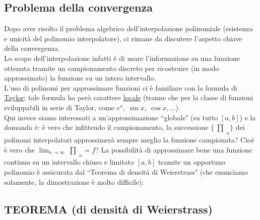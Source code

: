 \documentclass[12pt,headings=optiontohead]{article}
\DeclarePairedDelimiter{\abs}{\lvert}{\rvert}
\newcommand{\inter}{\begin{matrix}\prod\end{matrix}}
\begin{document}
\subsection{Problema della convergenza}
Dopo aver risolto il problema algebrico dell'interpolazione polinomiale (esistenza e unicità del polinomio interpolatore), ci rimane da discutere l'aspetto chiave della convergenza.\\
Lo scopo dell'interpolazione infatti è di usare l'informazione su una funzione ottenuta tramite un campionamento discreto per ricostruire (in modo approssimato)
la funzione su un intero intervallo.\\
L'uso di polinomi per approssimare funzioni ci è familiare con la formula di \uline{Taylor}; tale formula ha però carattere \uline{locale} (tranne che per la classe di funzioni sviluppabili in serie di Taylor, come $e^x,\ \sin{x},\ \cos{x}, \dotso$).\\
Qui invece siamo interessati a un'approssimazione ``globale" (su tutto $[a,b]$) e la domanda è: è vero che infittendo il campionamento, la successione $\{\inter_n\}$ dei polinomi interpolatori
approssimerà sempre meglio la funzione campionata? Cioè è vero che $\lim_{n \to \infty} \inter_n = f$? \newline \newline
La possibilità di approssimare bene una funzione continua su un intervallo chiuso e limitato $[a,b]$ tramite un opportuno polinomio è assicurata dal ``Teorema di densità di Weierstrass" (che enunciamo solamente, la dimostrazione è molto difficile):


\subsection{TEOREMA (di densità di Weierstrass)}
\begin{center}
\end{center}
\end{document}
